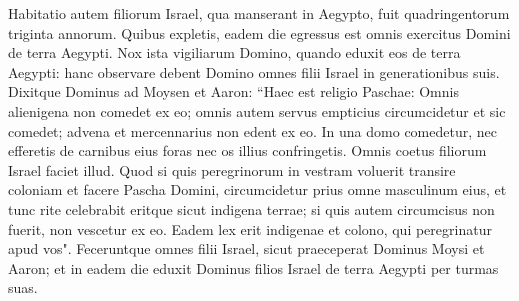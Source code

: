 \begin{biblechapter}
\verse Habitatio autem filiorum Israel, qua manserant in Aegypto, fuit quadringentorum triginta annorum. 
\verse Quibus expletis, eadem die egressus est omnis exercitus Domini de terra Aegypti. 
\verse Nox ista vigiliarum Domino, quando eduxit eos de terra Aegypti: hanc observare debent Domino omnes filii Israel in generationibus suis. 
\verse Dixitque Dominus ad Moysen et Aaron: “Haec est religio Paschae: Omnis alienigena non comedet ex eo; 
\verse omnis autem servus empticius circumcidetur et sic comedet; 
\verse advena et mercennarius non edent ex eo. 
\verse In una domo comedetur, nec efferetis de carnibus eius foras nec os illius confringetis.  
\verse Omnis coetus filiorum Israel faciet illud. 
\verse Quod si quis peregrinorum in vestram voluerit transire coloniam et facere Pascha Domini, circumcidetur prius omne masculinum eius, et tunc rite celebrabit eritque sicut indigena terrae; si quis autem circumcisus non fuerit, non vescetur ex eo. 
\verse Eadem lex erit indigenae et colono, qui peregrinatur apud vos". 
\verse Feceruntque omnes filii Israel, sicut praeceperat Dominus Moysi et Aaron; 
\verse et in eadem die eduxit Dominus filios Israel de terra Aegypti per turmas suas. 
\end{biblechapter}

